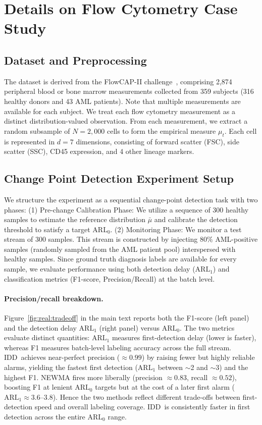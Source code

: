\documentclass{article}
\newcommand{\algoname}{\textsc{IDD}\xspace}
\theoremstyle{plain}
\theoremstyle{definition}
\theoremstyle{remark}
\begin{document}
\section{Details on Flow Cytometry Case Study}
\label{app:aml_details}

\subsection{Dataset and Preprocessing}
The dataset is derived from the FlowCAP-II challenge~\citep{aghaeepour2013critical}, comprising 2,874 peripheral blood or bone marrow measurements collected from 359 subjects (316 healthy donors and 43 AML patients). Note that multiple measurements are available for each subject.
We treat each flow cytometry measurement as a distinct distribution-valued observation. From each measurement, we extract a random subsample of $N=2,000$ cells to form the empirical measure $\mu_t$.
Each cell is represented in $d=7$ dimensions, consisting of forward scatter (FSC), side scatter (SSC), CD45 expression, and 4 other lineage markers.


\subsection{Change Point Detection Experiment Setup}
We structure the experiment as a sequential change-point detection task with two phases:
(1) Pre-change Calibration Phase: We utilize a sequence of 300 healthy samples to estimate the reference distribution $\bar{\mu}$ and calibrate the detection threshold to satisfy a target $\mathrm{ARL}_0$.
(2) Monitoring Phase: We monitor a test stream of 300 samples. This stream is constructed by injecting 80\% AML-positive samples (randomly sampled from the AML patient pool) interspersed with healthy samples.
Since ground truth diagnosis labels are available for every sample, we evaluate performance using both detection delay ($\mathrm{ARL}_1$) and classification metrics (F1-score, Precision/Recall) at the batch level.

\paragraph{Precision/recall breakdown.}
Figure~\ref{fig:real:tradeoff} in the main text reports both the F1-score (left panel) and the detection delay $\mathrm{ARL}_1$ (right panel) versus $\mathrm{ARL}_0$. The two metrics evaluate distinct quantities: $\mathrm{ARL}_1$ measures first-detection delay (lower is faster), whereas F1 measures batch-level labeling accuracy across the full stream. \algoname\ achieves near-perfect precision ($\approx 0.99$) by raising fewer but highly reliable alarms, yielding the fastest first detection ($\mathrm{ARL}_1$ between $\sim$2 and $\sim$3) and the highest F1. NEWMA fires more liberally (precision $\approx 0.83$, recall $\approx 0.52$), boosting F1 at lenient $\mathrm{ARL}_0$ targets but at the cost of a later first alarm ($\mathrm{ARL}_1\approx 3.6$--$3.8$). Hence the two methods reflect different trade-offs between first-detection speed and overall labeling coverage. \algoname\ is consistently faster in first detection across the entire $\mathrm{ARL}_0$ range.
\end{document}
